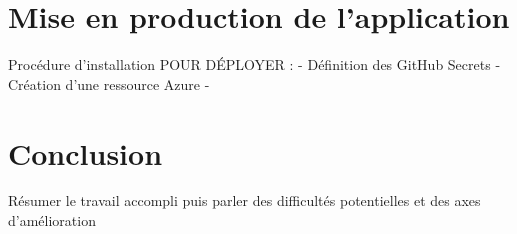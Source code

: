 \documentclass[french]{article}
\begin{document}
    \section{Mise en production de l'application}
    Procédure d'installation 
    POUR DÉPLOYER :
    - Définition des GitHub Secrets
    - Création d'une ressource Azure
    - 
    
    \newpage
    \section*{Conclusion}
    Résumer le travail accompli puis parler des difficultés potentielles et des axes d'amélioration
    
    


    
\end{document}
